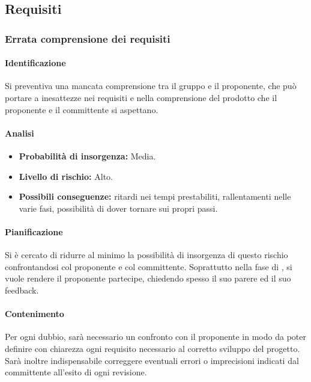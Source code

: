 \subsection{Requisiti}
\subsubsection{Errata comprensione dei requisiti}
\paragraph{Identificazione}
Si preventiva una mancata comprensione tra il gruppo e il proponente, che può portare a inesattezze nei requisiti e nella comprensione del prodotto che il proponente e il committente si aspettano.

\paragraph{Analisi}
\begin{itemize}
	\item \textbf{Probabilità di insorgenza:} Media.
	\item \textbf{Livello di rischio:} Alto.
	\item \textbf{Possibili conseguenze:} ritardi nei tempi prestabiliti, rallentamenti nelle varie fasi, possibilità di dover tornare sui propri passi.
\end{itemize}

\paragraph {Pianificazione}
Si è cercato di ridurre al minimo la possibilità di insorgenza di questo rischio confrontandosi col proponente e col committente. Soprattutto nella fase di \AdR{}, si vuole rendere il proponente partecipe, chiedendo spesso il suo parere ed il suo feedback.

\paragraph {Contenimento}
Per ogni dubbio, sarà necessario un confronto con il proponente in modo da poter definire con chiarezza ogni requisito necessario al corretto sviluppo del progetto. Sarà inoltre indispensabile correggere eventuali errori o imprecisioni indicati dal committente all’esito di ogni revisione.